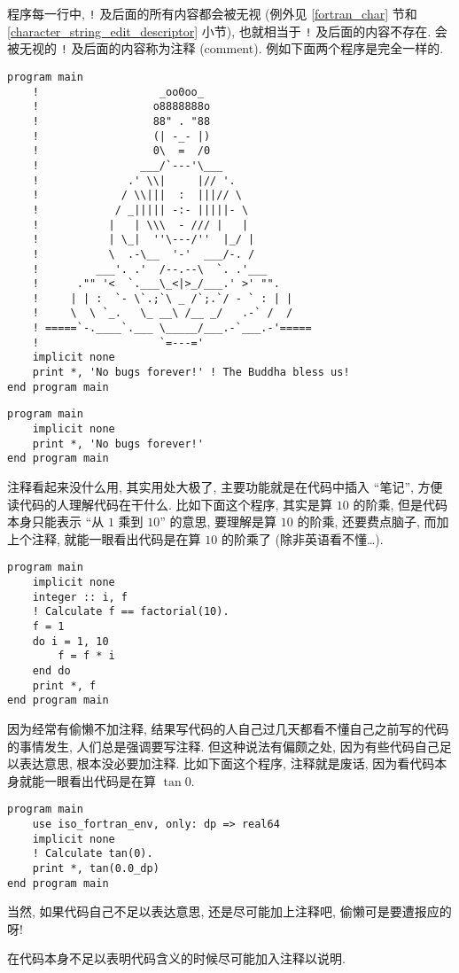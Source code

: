 程序每一行中, \texttt{!} 及后面的所有内容都会被无视 (例外见 \ref{fortran_char} 节和 \ref{character_string_edit_descriptor} 小节), 也就相当于 \texttt{!} 及后面的内容不存在. 会被无视的 \texttt{!} 及后面的内容称为注释 (comment). 例如下面两个程序是完全一样的.
\begin{lstlisting}
program main
    !                   _oo0oo_
    !                  o8888888o
    !                  88" . "88
    !                  (| -_- |)
    !                  0\  =  /0
    !                ___/`---'\___
    !              .' \\|     |// '.
    !             / \\|||  :  |||// \
    !            / _||||| -:- |||||- \
    !           |   | \\\  - /// |   |
    !           | \_|  ''\---/''  |_/ |
    !           \  .-\__  '-'  ___/-. /
    !         ___'. .'  /--.--\  `. .'___
    !      ."" '<  `.___\_<|>_/___.' >' "".
    !     | | :  `- \`.;`\ _ /`;.`/ - ` : | |
    !     \  \ `_.   \_ __\ /__ _/   .-` /  /
    ! =====`-.____`.___ \_____/___.-`___.-'=====
    !                   `=---='
    implicit none
    print *, 'No bugs forever!' ! The Buddha bless us!
end program main
\end{lstlisting}
\begin{lstlisting}
program main
    implicit none
    print *, 'No bugs forever!'
end program main
\end{lstlisting}

注释看起来没什么用, 其实用处大极了, 主要功能就是在代码中插入 ``笔记'', 方便读代码的人理解代码在干什么. 比如下面这个程序, 其实是算 $10$ 的阶乘, 但是代码本身只能表示 ``从 $1$ 乘到 $10$'' 的意思, 要理解是算 $10$ 的阶乘, 还要费点脑子, 而加上个注释, 就能一眼看出代码是在算 $10$ 的阶乘了 (除非英语看不懂\dots{}).
\begin{lstlisting}
program main
    implicit none
    integer :: i, f
    ! Calculate f == factorial(10).
    f = 1
    do i = 1, 10
        f = f * i
    end do
    print *, f
end program main
\end{lstlisting}

因为经常有偷懒不加注释, 结果写代码的人自己过几天都看不懂自己之前写的代码的事情发生, 人们总是强调要写注释. 但这种说法有偏颇之处, 因为有些代码自己足以表达意思, 根本没必要加注释. 比如下面这个程序, 注释就是废话, 因为看代码本身就能一眼看出代码是在算 $\tan 0$.
\begin{lstlisting}
program main
    use iso_fortran_env, only: dp => real64
    implicit none
    ! Calculate tan(0).
    print *, tan(0.0_dp)
end program main
\end{lstlisting}
当然, 如果代码自己不足以表达意思, 还是尽可能加上注释吧, 偷懒可是要遭报应的呀!
\begin{convention}
    在代码本身不足以表明代码含义的时候尽可能加入注释以说明.
\end{convention}

